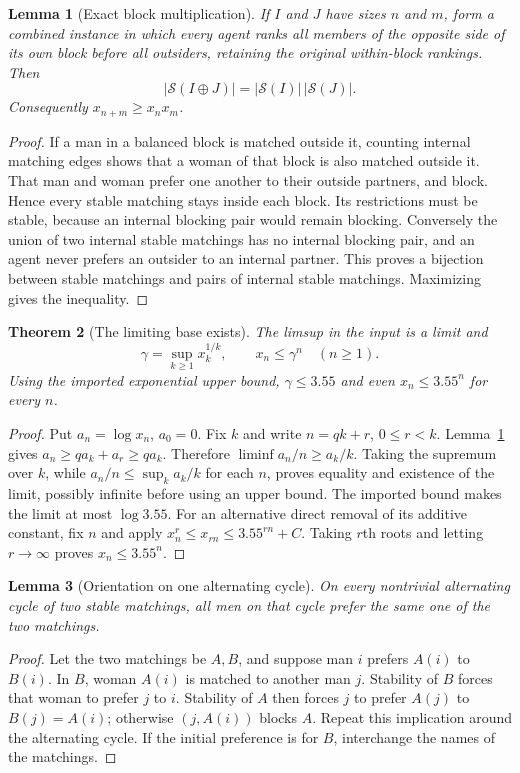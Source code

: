 \documentclass[11pt,a4paper]{article}
\newtheorem{theorem}{Theorem}[section]
\newtheorem{lemma}[theorem]{Lemma}
\theoremstyle{remark}\newtheorem{remark}[theorem]{Remark}
\begin{document}
\begin{lemma}[Exact block multiplication]\label{lem:block}
If $I$ and $J$ have sizes $n$ and $m$, form a combined instance in which every agent ranks all members of the opposite side of its own block before all outsiders, retaining the original within-block rankings. Then
\[
|\mathcal S(I\oplus J)|=|\mathcal S(I)|\,|\mathcal S(J)|.
\]
Consequently $x_{n+m}\ge x_nx_m$.
\end{lemma}
\begin{proof}
If a man in a balanced block is matched outside it, counting internal matching edges shows that a woman of that block is also matched outside it. That man and woman prefer one another to their outside partners, and block. Hence every stable matching stays inside each block. Its restrictions must be stable, because an internal blocking pair would remain blocking. Conversely the union of two internal stable matchings has no internal blocking pair, and an agent never prefers an outsider to an internal partner. This proves a bijection between stable matchings and pairs of internal stable matchings. Maximizing gives the inequality.
\end{proof}

\begin{theorem}[The limiting base exists]
The limsup in the input is a limit and
\[
\gamma=\sup_{k\ge1}x_k^{1/k},\qquad x_n\le\gamma^n\quad(n\ge1).
\]
Using the imported exponential upper bound, $\gamma\le3.55$ and even $x_n\le3.55^n$ for every $n$.
\end{theorem}
\begin{proof}
Put $a_n=\log x_n$, $a_0=0$. Fix $k$ and write $n=qk+r$, $0\le r<k$. Lemma~\ref{lem:block} gives $a_n\ge q a_k+a_r\ge q a_k$. Therefore $\liminf a_n/n\ge a_k/k$. Taking the supremum over $k$, while $a_n/n\le\sup_k a_k/k$ for each $n$, proves equality and existence of the limit, possibly infinite before using an upper bound. The imported bound makes the limit at most $\log3.55$. For an alternative direct removal of its additive constant, fix $n$ and apply $x_n^r\le x_{rn}\le3.55^{rn}+C$. Taking $r$th roots and letting $r\to\infty$ proves $x_n\le3.55^n$.
\end{proof}

\begin{lemma}[Orientation on one alternating cycle]\label{lem:cycle}
On every nontrivial alternating cycle of two stable matchings, all men on that cycle prefer the same one of the two matchings.
\end{lemma}
\begin{proof}
Let the two matchings be $A,B$, and suppose man $i$ prefers $A(i)$ to $B(i)$. In $B$, woman $A(i)$ is matched to another man $j$. Stability of $B$ forces that woman to prefer $j$ to $i$. Stability of $A$ then forces $j$ to prefer $A(j)$ to $B(j)=A(i)$; otherwise $(j,A(i))$ blocks $A$. Repeat this implication around the alternating cycle. If the initial preference is for $B$, interchange the names of the matchings.
\end{proof}
\end{document}
